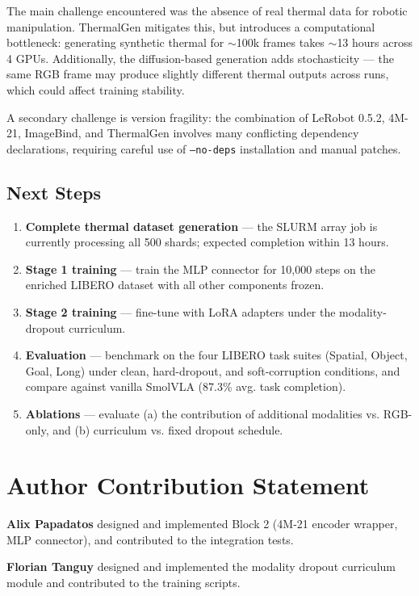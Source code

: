 \documentclass[10pt,conference,compsocconf]{IEEEtran}
\begin{document}
The main challenge encountered was the absence of real thermal data for robotic manipulation. ThermalGen mitigates this, but introduces a computational bottleneck: generating synthetic thermal for $\sim$100k frames takes $\sim$13 hours across 4 GPUs. Additionally, the diffusion-based generation adds stochasticity — the same RGB frame may produce slightly different thermal outputs across runs, which could affect training stability.

A secondary challenge is version fragility: the combination of LeRobot 0.5.2, 4M-21, ImageBind, and ThermalGen involves many conflicting dependency declarations, requiring careful use of \texttt{--no-deps} installation and manual patches.

\subsection{Next Steps}

\begin{enumerate}
    \item \textbf{Complete thermal dataset generation} — the SLURM array job is currently processing all 500 shards; expected completion within 13 hours.
    \item \textbf{Stage 1 training} — train the MLP connector for 10,000 steps on the enriched LIBERO dataset with all other components frozen.
    \item \textbf{Stage 2 training} — fine-tune with LoRA adapters under the modality-dropout curriculum.
    \item \textbf{Evaluation} — benchmark on the four LIBERO task suites (Spatial, Object, Goal, Long) under clean, hard-dropout, and soft-corruption conditions, and compare against vanilla SmolVLA (87.3\% avg. task completion).
    \item \textbf{Ablations} — evaluate (a) the contribution of additional modalities vs. RGB-only, and (b) curriculum vs. fixed dropout schedule.
\end{enumerate}


\section{Author Contribution Statement}

\textbf{Alix Papadatos} designed and implemented Block 2 (4M-21 encoder wrapper, MLP connector), and contributed to the integration tests.

\textbf{Florian Tanguy} designed and implemented the modality dropout curriculum module and contributed to the training scripts.
\end{document}
